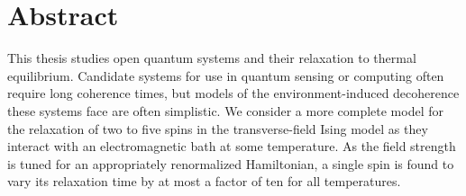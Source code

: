 \chapter*{Abstract}

This thesis studies open quantum systems and their relaxation to thermal
equilibrium. Candidate systems for use in quantum sensing or computing often
require long coherence times, but models of the environment-induced decoherence
these systems face are often simplistic. We consider a more complete model for
the relaxation of two to five spins in the transverse-field Ising model as they
interact with an electromagnetic bath at some temperature. As the field strength
is tuned for an appropriately renormalized Hamiltonian, a single spin is found
to vary its relaxation time by at most a factor of ten for all temperatures.

